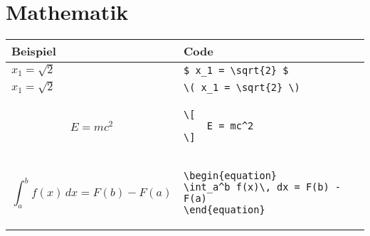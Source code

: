 \section{Mathematik}



\begin{tabular}{|p{}|p{}|}
    \hline
    \textbf{Beispiel} & \textbf{Code} \\
    \hline
    $ x_1 = \sqrt{2} $ & \lstinline|$ x_1 = \sqrt{2} $| \\ 
    \( x_1 = \sqrt{2} \) & \lstinline|\( x_1 = \sqrt{2} \)| \\ 
    \[
        E = mc^2
    \]
    & \begin{lstlisting}
\[
    E = mc^2
\]
    \end{lstlisting} \\ 
    \begin{equation}
        \int_a^b f(x)\, dx = F(b) - F(a)
    \end{equation}
    & \begin{lstlisting}
\begin{equation}
\int_a^b f(x)\, dx = F(b) - F(a)
\end{equation}
    \end{lstlisting} \\ 
    \hline
\end{tabular}
